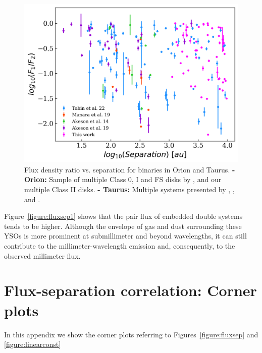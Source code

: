 \documentclass{aa}
\begin{document}
\begin{appendix}
\begin{figure}[hbt!]
\centering
   \includegraphics[width=\columnwidth]{tobincomparison_Zagaria.png}
     \caption{Flux density ratio vs. separation for binaries in Orion and Taurus. \textbf{- Orion:} Sample of multiple Class 0, I and FS disks by \cite{Tobin_2022}, and our multiple Class II disks. \textbf{- Taurus:} Multiple systems presented by \cite{Akeson19}, \cite{Manara19}, and \cite{Akeson14}.}
     \label{figure:tobinzagaria}
\end{figure}

Figure~\ref{figure:fluxsep1} shows that the pair flux of embedded double systems tends to be higher. Although the envelope of gas and dust surrounding these YSOs is more prominent at submillimeter and beyond wavelengths, it can still contribute to the millimeter-wavelength emission and, consequently, to the observed millimeter flux. 


\newpage
\FloatBarrier
\section{Flux-separation correlation: Corner plots} \label{AppendixCorn}
In this appendix we show the corner plots referring to Figures~\ref{figure:fluxsep} and \ref{figure:linearconst}


\end{appendix}
\end{document}
